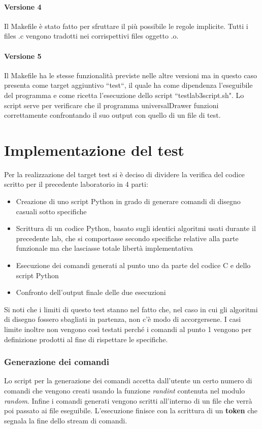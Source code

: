 \documentclass{article}
\begin{document}
		\paragraph*{Versione 4}
			Il Makefile è stato fatto per sfruttare il più possibile le regole implicite. Tutti i files .c vengono tradotti
			nei corrispettivi files oggetto .o.
		\paragraph*{Versione 5}
		Il Makefile ha le stesse funzionalità previste nelle altre versioni ma in questo caso presenta come target aggiuntivo ``test``, il quale ha come dipendenza l'eseguibile del programma e come ricetta l'esecuzione dello script ``test\textunderscore lab3\textunderscore script.sh". Lo script serve per verificare che il programma universalDrawer funzioni correttamente confrontando il suo output con quello di un file di test.
\section{Implementazione del test}
	Per la realizzazione del target test si è deciso di dividere la verifica del codice scritto per il precedente laboratorio 
	in 4 parti:
	\begin{itemize}
		\item Creazione di uno script Python in grado di generare comandi di disegno casuali sotto specifiche
		\item Scrittura di un codice Python, basato sugli identici algoritmi usati durante il precedente lab, che si comportasse secondo specifiche relative alla parte funzionale ma che lasciasse totale libertà implementativa
		\item Esecuzione dei comandi generati al punto uno da parte del codice C e dello script Python
		\item Confronto dell'output finale delle due esecuzioni
	\end{itemize}
	Si noti che i limiti di questo test stanno nel fatto che, nel caso in cui gli algoritmi di disegno fossero sbagliati in 
	partenza, non c'è modo di accorgersene. I casi limite inoltre non vengono così testati perché i comandi al punto 1 vengono 
	per definizione prodotti al fine di rispettare le specifiche.

	\subsubsection*{Generazione dei comandi}
		Lo script per la generazione dei comandi accetta dall'utente un certo numero di comandi che vengono creati usando la funzione \textit{randint} contenuta nel modulo \textit{random}. Infine i comandi generati vengono scritti all'interno di un file che verrà poi passato ai file eseguibile.
		L'esecuzione finisce con la scrittura di un \textbf{token} che segnala la fine dello stream di comandi.
\end{document}
